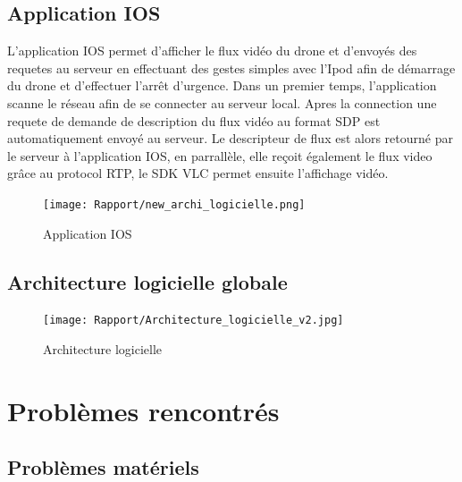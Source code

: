 \documentclass{article}
\begin{document}
     \subsection{Application IOS}
     L'application IOS permet d'afficher le flux vidéo du drone et d'envoyés des requetes au serveur en effectuant des gestes simples avec l'Ipod afin de démarrage du drone et d'effectuer l'arrêt d'urgence.
     \vspace{0.2cm}
     \newline
     Dans un premier temps, l'application scanne le réseau afin de se connecter au serveur local.
     Apres la connection une requete de demande de description du flux vidéo au format SDP est automatiquement envoyé au serveur.
     \vspace{0.2cm}
     \newline
     Le descripteur de flux est alors retourné par le serveur à l'application IOS, en parrallèle, elle reçoit également le flux video grâce au protocol RTP, le SDK VLC permet ensuite l'affichage vidéo.
        \vspace*{0.3cm}
	    \begin{center}
		\begin{figure}[!h]
		\texttt{[image: Rapport/new\_archi\_logicielle.png]}\\
		\caption{Application IOS}
		\end{figure}
        \end{center}
        
    \newpage
	
	\subsection{Architecture logicielle globale}
	    \vspace*{0.3cm}
	    \begin{center}
		\begin{figure}[!h]
		\texttt{[image: Rapport/Architecture\_logicielle\_v2.jpg]}\\
		\caption{Architecture logicielle}
		\end{figure}
        \end{center}
		
\newpage
\section{Problèmes rencontrés}
	\subsection{Problèmes matériels}
		
\end{document}
